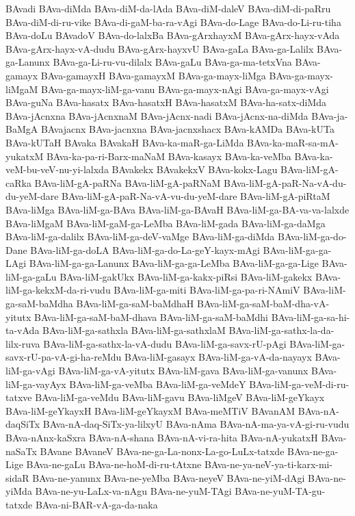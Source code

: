 {BAvadi
BAva-diMda
BAva-diM-da-lAda
BAva-diM-daleV
BAva-diM-di-paRru
BAva-diM-di-ru-vike
BAva-di-gaM-ba-ra-vAgi
BAva-do-Lage
BAva-do-Li-ru-tiha
BAva-doLu
BAvadoV
BAva-do-lalxBa
BAva-gArxhayxM
BAva-gArx-hayx-vAda
BAva-gArx-hayx-vA-dudu
BAva-gArx-hayxvU
BAva-gaLa
BAva-ga-Lalilx
BAva-ga-Lanunx
BAva-ga-Li-ru-vu-dilalx
BAva-gaLu
BAva-ga-ma-tetxVna
BAva-gamayx
BAva-gamayxH
BAva-gamayxM
BAva-ga-mayx-liMga
BAva-ga-mayx-liMgaM
BAva-ga-mayx-liM-ga-vanu
BAva-ga-mayx-nAgi
BAva-ga-mayx-vAgi
BAva-guNa
BAva-hasatx
BAva-hasatxH
BAva-hasatxM
BAva-ha-satx-diMda
BAva-jAcnxna
BAva-jAcnxnaM
BAva-jAcnx-nadi
BAva-jAcnx-na-diMda
BAva-ja-BaMgA
BAvajacnx
BAva-jacnxna
BAva-jacnxshacx
BAva-kAMDa
BAva-kUTa
BAva-kUTaH
BAvaka
BAvakaH
BAva-ka-maR-ga-LiMda
BAva-ka-maR-sa-mA-yukatxM
BAva-ka-pa-ri-Barx-maNaM
BAva-kasayx
BAva-ka-veMba
BAva-ka-veM-bu-veV-nu-yi-lalxda
BAvakekx
BAvakekxV
BAva-kokx-Lagu
BAva-liM-gA-caRka
BAva-liM-gA-paRNa
BAva-liM-gA-paRNaM
BAva-liM-gA-paR-Na-vA-du-du-yeM-dare
BAva-liM-gA-paR-Na-vA-vu-du-yeM-dare
BAva-liM-gA-piRtaM
BAva-liMga
BAva-liM-ga-BAva
BAva-liM-ga-BAvaH
BAva-liM-ga-BA-va-va-lalxde
BAva-liMgaM
BAva-liM-gaM-ga-LeMba
BAva-liM-gada
BAva-liM-ga-daMga
BAva-liM-ga-dalilx
BAva-liM-ga-deV-vaMge
BAva-liM-ga-diMda
BAva-liM-ga-do-Dane
BAva-liM-ga-doLA
BAva-liM-ga-do-La-geY-kayx-mAgi
BAva-liM-ga-ga-LAgi
BAva-liM-ga-ga-Lanunx
BAva-liM-ga-ga-LeMba
BAva-liM-ga-ga-Lige
BAva-liM-ga-gaLu
BAva-liM-gakUkx
BAva-liM-ga-kakx-piRsi
BAva-liM-gakekx
BAva-liM-ga-kekxM-da-ri-vudu
BAva-liM-ga-miti
BAva-liM-ga-pa-ri-NAmiV
BAva-liM-ga-saM-baMdha
BAva-liM-ga-saM-baMdhaH
BAva-liM-ga-saM-baM-dha-vA-yitutx
BAva-liM-ga-saM-baM-dhava
BAva-liM-ga-saM-baMdhi
BAva-liM-ga-sa-hi-ta-vAda
BAva-liM-ga-sathxla
BAva-liM-ga-sathxlaM
BAva-liM-ga-sathx-la-da-lilx-ruva
BAva-liM-ga-sathx-la-vA-dudu
BAva-liM-ga-savx-rU-pAgi
BAva-liM-ga-savx-rU-pa-vA-gi-ha-reMdu
BAva-liM-gasayx
BAva-liM-ga-vA-da-nayayx
BAva-liM-ga-vAgi
BAva-liM-ga-vA-yitutx
BAva-liM-gava
BAva-liM-ga-vanunx
BAva-liM-ga-vayAyx
BAva-liM-ga-veMba
BAva-liM-ga-veMdeY
BAva-liM-ga-veM-di-ru-tatxve
BAva-liM-ga-veMdu
BAva-liM-gavu
BAva-liMgeV
BAva-liM-geYkayx
BAva-liM-geYkayxH
BAva-liM-geYkayxM
BAva-meMTiV
BAvanAM
BAva-nA-daqSiTx
BAva-nA-daq-SiTx-ya-lilxyU
BAva-nAma
BAva-nA-ma-ya-vA-gi-ru-vudu
BAva-nAnx-kaSxra
BAva-nA-shana
BAva-nA-vi-ra-hita
BAva-nA-yukatxH
BAva-naSaTx
BAvane
BAvaneV
BAva-ne-ga-La-nonx-La-go-LuLx-tatxde
BAva-ne-ga-Lige
BAva-ne-gaLu
BAva-ne-hoM-di-ru-tAtxne
BAva-ne-ya-neV-ya-ti-karx-mi-sidaR
BAva-ne-yanunx
BAva-ne-yeMba
BAva-neyeV
BAva-ne-yiM-dAgi
BAva-ne-yiMda
BAva-ne-yu-LaLx-va-nAgu
BAva-ne-yuM-TAgi
BAva-ne-yuM-TA-gu-tatxde
BAva-ni-BAR-vA-ga-da-naka
}
